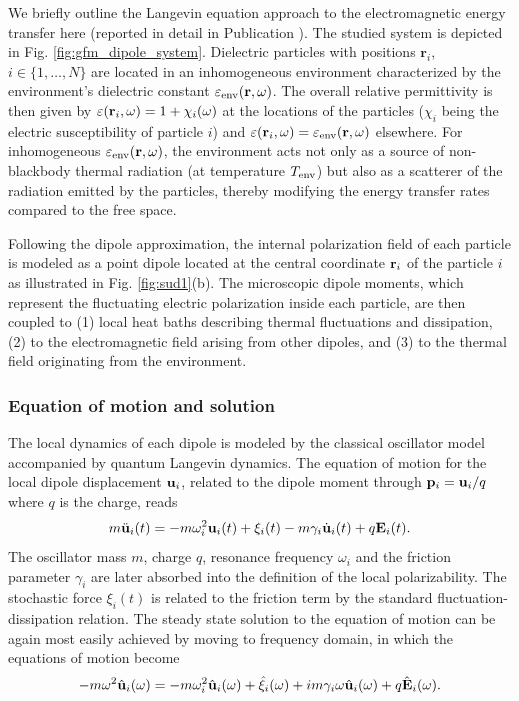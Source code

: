 We briefly outline the Langevin equation approach to the electromagnetic energy transfer here (reported in detail in Publication ). The studied system is depicted in Fig. \ref{fig:gfm_dipole_system}. Dielectric particles with positions $\mathbf{r}_i$, $i\in\{1,\dots,N\}$ are located in an inhomogeneous environment characterized by the environment's dielectric constant $\varepsilon_{\textrm{env}}(\mathbf{r},\omega)$. The overall relative permittivity is then given by $\varepsilon(\mathbf{r}_i,\omega)=1+\chi_i(\omega)$ at the locations of the particles ($\chi_i$ being the electric susceptibility of particle $i$) and $\varepsilon(\mathbf{r}_i,\omega)=\varepsilon_{\textrm{env}}(\mathbf{r},\omega)$ elsewhere. For inhomogeneous $\varepsilon_{\textrm{env}}(\mathbf{r},\omega)$, the environment acts not only as a source of non-blackbody thermal radiation (at temperature $T_{\textrm{env}}$) but also as a scatterer of the radiation emitted by the particles, thereby modifying the energy transfer rates compared to the free space.

Following the dipole approximation, the internal polarization field of each particle is modeled as a point dipole located at the central coordinate $\mathbf{r}_i$ of the particle $i$ as illustrated in Fig. \ref{fig:sud1}(b). The microscopic dipole moments, which represent the fluctuating electric polarization inside each particle, are then coupled to (1) local heat baths describing thermal fluctuations and dissipation, (2) to the electromagnetic field arising from other dipoles, and (3) to the thermal field originating from the environment.

\subsubsection{Equation of motion and solution}

The local dynamics of each dipole is modeled by the classical oscillator model accompanied by quantum Langevin dynamics. The equation of motion for the local dipole displacement $\mathbf{u}_i$, related to the dipole moment through $\mathbf{p}_i=\mathbf{u}_i/q$ where $q$ is the charge, reads
 \begin{equation}
 m\ddot{\mathbf{u}}_i(t) = -m\omega_i^2 \mathbf{u}_i(t) +\xi_i(t) -m\gamma_i \dot{\mathbf{u}}_i(t)  + q \mathbf{E}_i(t). \label{eq:gfm_eom1}
\end{equation}
The oscillator mass $m$, charge $q$, resonance frequency $\omega_i$ and the friction parameter $\gamma_i$ are later absorbed into the definition of the local polarizability. The stochastic force $\xi_i(t)$ is related to the friction term by the standard fluctuation-dissipation relation. The steady state solution to the equation of motion can be again most easily achieved by moving to frequency domain, in which the equations of motion become
\begin{equation}
 -m\omega^2 \hat{\mathbf{u}}_i(\omega) = -m\omega_i^2 \hat{\mathbf{u}}_i(\omega) +\hat \xi_i(\omega) +im\gamma_i \omega \hat {\mathbf{u}}_i(\omega)  + q \hat {\mathbf{E}}_i(\omega). \label{eq:gfm_eom2}
\end{equation}


